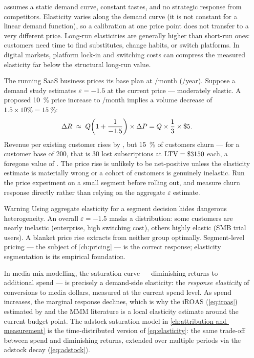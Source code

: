  assumes a static demand curve, constant tastes, and no strategic response
from competitors. Elasticity varies along the demand curve (it is not constant for a linear demand
function), so a calibration at one price point does not transfer to a very different price.
Long-run elasticities are generally higher than short-run ones: customers need time to find
substitutes, change habits, or switch platforms. In digital markets, platform lock-in and
switching costs can compress the measured elasticity far below the structural long-run value.

\begin{example}
The running SaaS business prices its base plan at /month (/year).
Suppose a demand study estimates \(\varepsilon=-1.5\) at the current price --- moderately elastic.
A proposed \qty{10}{\percent} price increase to /month implies a volume decrease of
\(1.5\times10\%=\qty{15}{\percent}\):
\[
  \Delta R \;\approx\; Q\!\left(1+\frac{1}{-1.5}\right)\times\Delta P
           = Q\times\frac{1}{3}\times\$\num{5}.
\]
Revenue per existing customer rises by , but \qty{15}{\percent} of customers churn ---
for a customer base of \num{200}, that is \num{30} lost subscriptions at \(\mathrm{LTV}=\$\num{3150}\)
each, a foregone value of . The price rise is unlikely to be net-positive unless the
elasticity estimate is materially wrong or a cohort of customers is genuinely inelastic. Run the
price experiment on a small segment before rolling out, and measure churn response directly
rather than relying on the aggregate \(\varepsilon\) estimate.
\end{example}

\begin{admonition}{Warning}
Using aggregate elasticity for a segment decision hides dangerous heterogeneity. An overall
\(\varepsilon=-1.5\) masks a distribution: some customers are nearly inelastic (enterprise, high
switching cost), others highly elastic (SMB trial users). A blanket price rise extracts from
neither group optimally. Segment-level pricing --- the subject of \cref{ch:pricing} --- is the
correct response; elasticity segmentation is its empirical foundation.
\end{admonition}

In media-mix modelling, the saturation curve --- diminishing returns to additional spend --- is
precisely a demand-side elasticity: the \emph{response elasticity} of conversions to media
dollars, measured at the current spend level. As spend increases, the marginal response declines,
which is why the \(\mathrm{iROAS}\) (\cref{eq:iroas}) estimated by \textcite{hanssens2001marketing}
and the MMM literature is a local elasticity estimate around the current budget point. The
adstock-saturation model in \cref{ch:attribution-and-measurement} is the time-distributed version
of \cref{eq:elasticity}: the same trade-off between spend and diminishing returns, extended over
multiple periods via the adstock decay (\cref{eq:adstock}).

